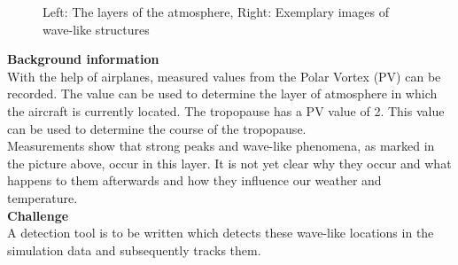 \documentclass[pagenumoff]{kit-document}
\begin{document}
	\begin{figure}[ht]
		\centering
		\caption*{Left: The layers of the atmosphere, Right: Exemplary images of wave-like structures}
	\end{figure}

	{\bfseries Background information}\\
	With the help of airplanes, measured values from the Polar Vortex (PV) can be recorded. The value can be used to determine the layer of atmosphere in which the aircraft is currently located. The tropopause has a PV value of 2. This value can be used to determine the course of the tropopause.\\
	Measurements show that strong peaks and wave-like phenomena, as marked in the picture above, occur in this layer. It is not yet clear why they occur and what happens to them afterwards and how they influence our weather and temperature. \\
	
	{\bfseries Challenge}\\
	A detection tool is to be written which detects these wave-like locations in the simulation data and subsequently tracks them. 
\end{document}
